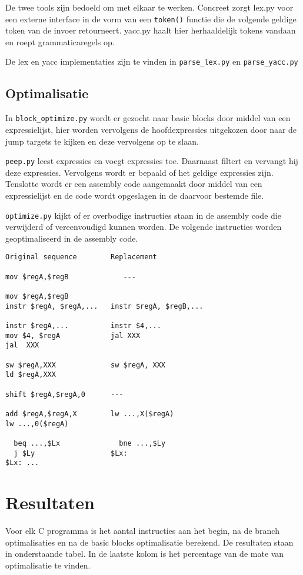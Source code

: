 \documentclass[11pt]{article}
\begin{document}
De twee tools zijn bedoeld om met elkaar te werken. Concreet zorgt lex.py voor 
een externe interface in de vorm van een \verb'token()' functie die de volgende
geldige token van de invoer retourneert. yacc.py haalt hier herhaaldelijk 
tokens vandaan en roept grammaticaregels op.

De lex en yacc implementaties zijn te vinden in \verb'parse_lex.py' en 
\verb'parse_yacc.py'

\subsection{Optimalisatie}
In \verb'block_optimize.py' wordt er gezocht naar basic blocks door middel van
een expressielijst, hier worden vervolgens de hoofdexpressies uitgekozen door 
naar de jump targets te kijken en deze vervolgens op te slaan.

\verb'peep.py' leest expressies en voegt expressies toe. Daarnaast filtert en 
vervangt hij deze expressies. Vervolgens wordt er bepaald of het geldige 
expressies zijn. Tenslotte wordt er een assembly code aangemaakt door middel 
van een expressielijst en de code wordt opgeslagen in de daarvoor bestemde 
file.

\verb'optimize.py' kijkt of er overbodige instructies staan in de assembly
code die verwijderd of vereenvoudigd kunnen worden. De volgende instructies 
worden geoptimaliseerd in de assembly code.

\begin{verbatim}
Original sequence        Replacement

mov $regA,$regB     	    ---

mov $regA,$regB
instr $regA, $regA,...   instr $regA, $regB,...

instr $regA,...          instr $4,...
mov $4, $regA            jal XXX
jal  XXX

sw $regA,XXX             sw $regA, XXX
ld $regA,XXX

shift $regA,$regA,0      ---

add $regA,$regA,X        lw ...,X($regA)
lw ...,0($regA)

  beq ...,$Lx              bne ...,$Ly
  j $Ly                  $Lx:
$Lx: ...
\end{verbatim}

\section{Resultaten}

Voor elk C programma is het aantal instructies aan het begin, na de branch
optimalisaties en na de basic blocks optimalisatie berekend. De resultaten
staan in onderstaande tabel. In de laatste kolom is het percentage van de 
mate van optimalisatie te vinden.
\end{document}
